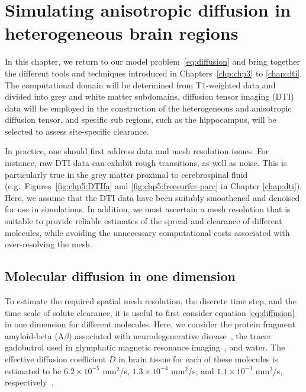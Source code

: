 \chapter{Simulating anisotropic diffusion in heterogeneous brain regions}
\label{chp:chp6}

In this chapter, we return to our model problem~\eqref{eq:diffusion}
and bring together the different tools and techniques introduced in
Chapters~\ref{chp:chp3} to \ref{chap:dti}. The computational domain will
be determined from T1-weighted data and divided into grey and white matter
subdomains, diffusion tensor imaging (DTI) data will be employed in the construction of the
heterogeneous and anisotropic diffusion tensor, and specific
sub regions, such as the hippocampus, will be selected to assess
site-specific clearance.

In practice, one should first address data and mesh resolution
issues. For instance, raw DTI data can exhibit rough transitions, as
well as noise. This is particularly true in the grey matter proximal
to cerebrospinal fluid (e.g.~Figures~\ref{fig:chp5:DTIfa} and
\ref{fig:chp5:freesurfer-parc} in Chapter \ref{chap:dti}). Here, we assume that 
the DTI data have been suitably smoothened and denoised for use in simulations. In
addition, we must ascertain a mesh resolution that is suitable to
provide reliable estimates of the spread and clearance of different
molecules, while avoiding the unnecessary computational costs
associated with over-resolving the mesh.

\section{Molecular diffusion in one dimension}
\label{sec:chp6:1D-tests}

To estimate the required spatial mesh resolution, the discrete
time step, and the time scale of solute clearance, it is useful to
first consider equation \eqref{eq:diffusion} in one dimension for different
molecules. Here, we consider the protein fragment amyloid-beta
(A$\beta$) associated with neurodegenerative
disease~\cite{iliff2012paravascular}, the tracer gadobutrol used in
glymphatic magnetic resonance imaging~\cite{ringstad2018brain}, and water. The
effective diffusion coefficient $D$ in brain tissue for each of these
molecules is estimated to be $6.2 \times 10^{-5}$ mm$^2$/s,
$1.3 \times 10^{-4}$ mm$^2$/s, and $1.1 \times 10^{-3}$ mm$^2$/s,
respectively~\cite{waters2010concentration,valnes2020apparent}.

